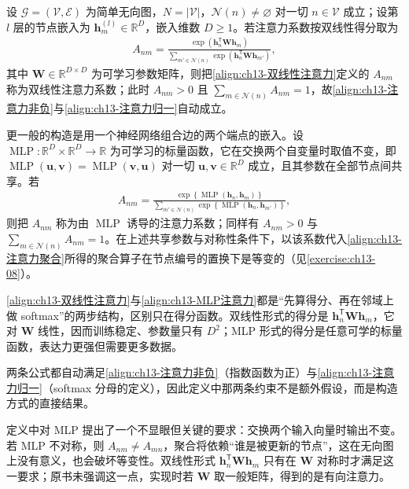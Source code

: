 \documentclass[../../main.tex]{subfiles}
\begin{document}
\begin{definition}[注意力系数]\label{definition:ch13-注意力系数}
设 $\mathcal{G}=(\mathcal{V},\mathcal{E})$ 为简单无向图，$N=|\mathcal{V}|$，$\mathcal{N}(n)\neq\varnothing$ 对一切 $n\in\mathcal{V}$ 成立；设第 $l$ 层的节点嵌入为 $\bm{h}_m^{(l)}\in\mathbb{R}^{D}$，嵌入维数 $D\geqslant1$。若注意力系数按双线性得分取为
\begin{align}
A_{nm}=\frac{\exp\!\left(\bm{h}_n^{\mathsf T}\bm{W}\bm{h}_m\right)}{\sum_{m'\in\mathcal{N}(n)}\exp\!\left(\bm{h}_n^{\mathsf T}\bm{W}\bm{h}_{m'}\right)},
\label{align:ch13-双线性注意力}
\end{align}
其中 $\bm{W}\in\mathbb{R}^{D\times D}$ 为可学习参数矩阵，则把\eqref{align:ch13-双线性注意力}定义的 $A_{nm}$ 称为双线性注意力系数；此时 $A_{nm}>0$ 且 $\sum_{m\in\mathcal{N}(n)}A_{nm}=1$，故\eqref{align:ch13-注意力非负}与\eqref{align:ch13-注意力归一}自动成立。

更一般的构造是用一个神经网络组合边的两个端点的嵌入。设 $\operatorname{MLP}:\mathbb{R}^{D}\times\mathbb{R}^{D}\to\mathbb{R}$ 为可学习的标量函数，它在交换两个自变量时取值不变，即 $\operatorname{MLP}(\bm{u},\bm{v})=\operatorname{MLP}(\bm{v},\bm{u})$ 对一切 $\bm{u},\bm{v}\in\mathbb{R}^{D}$ 成立，且其参数在全部节点间共享。若
\begin{align}
A_{nm}=\frac{\exp\!\left\{\operatorname{MLP}(\bm{h}_n,\bm{h}_m)\right\}}{\sum_{m'\in\mathcal{N}(n)}\exp\!\left\{\operatorname{MLP}(\bm{h}_n,\bm{h}_{m'})\right\}},
\label{align:ch13-MLP注意力}
\end{align}
则把 $A_{nm}$ 称为由 $\operatorname{MLP}$ 诱导的注意力系数；同样有 $A_{nm}>0$ 与 $\sum_{m\in\mathcal{N}(n)}A_{nm}=1$。在上述共享参数与对称性条件下，以该系数代入\eqref{align:ch13-注意力聚合}所得的聚合算子在节点编号的置换下是等变的（见\cref{exercise:ch13-08}）。
\end{definition}

\begin{remark}
\eqref{align:ch13-双线性注意力}与\eqref{align:ch13-MLP注意力}都是“先算得分、再在邻域上做 softmax”的两步结构，区别只在得分函数。双线性形式的得分是 $\bm{h}_n^{\mathsf T}\bm{W}\bm{h}_m$，它对 $\bm{W}$ 线性，因而训练稳定、参数量只有 $D^2$；MLP 形式的得分是任意可学的标量函数，表达力更强但需要更多数据。\par
两条公式都自动满足\eqref{align:ch13-注意力非负}（指数函数为正）与\eqref{align:ch13-注意力归一}（softmax 分母的定义），因此定义中那两条约束不是额外假设，而是构造方式的直接结果。\par
定义中对 MLP 提出了一个不显眼但关键的要求：交换两个输入向量时输出不变。若 MLP 不对称，则 $A_{nm}\neq A_{mn}$，聚合将依赖“谁是被更新的节点”，这在无向图上没有意义，也会破坏等变性。双线性形式 $\bm{h}_n^{\mathsf T}\bm{W}\bm{h}_m$ 只有在 $\bm{W}$ 对称时才满足这一要求；原书未强调这一点，实现时若 $\bm{W}$ 取一般矩阵，得到的是有向注意力。
\end{remark}
\end{document}
